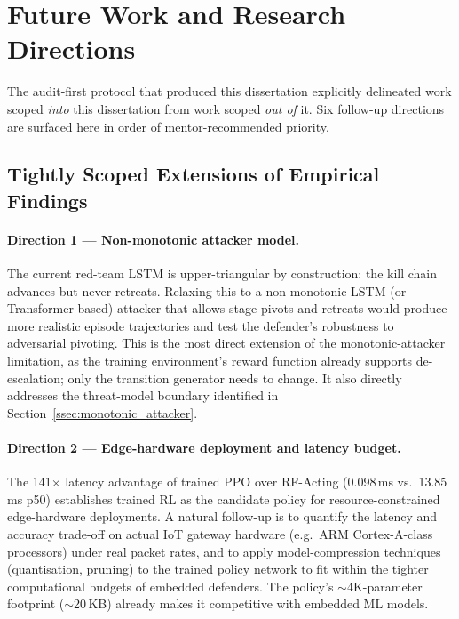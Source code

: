 \section{Future Work and Research Directions}\label{sec:future_work}
The audit-first protocol that produced this dissertation explicitly delineated work scoped \emph{into} this dissertation from work scoped \emph{out of} it. Six follow-up directions are surfaced here in order of mentor-recommended priority.

\subsection{Tightly Scoped Extensions of Empirical Findings}

\paragraph{Direction 1 --- Non-monotonic attacker model.} The current red-team LSTM is upper-triangular by construction: the kill chain advances but never retreats. Relaxing this to a non-monotonic LSTM (or Transformer-based) attacker that allows stage pivots and retreats would produce more realistic episode trajectories and test the defender's robustness to adversarial pivoting. This is the most direct extension of the monotonic-attacker limitation, as the training environment's reward function already supports de-escalation; only the transition generator needs to change. It also directly addresses the threat-model boundary identified in Section~\ref{ssec:monotonic_attacker}.

\paragraph{Direction 2 --- Edge-hardware deployment and latency budget.} The 141$\times$ latency advantage of trained PPO over RF-Acting (0.098\,ms vs.\ 13.85\,ms p50) establishes trained RL as the candidate policy for resource-constrained edge-hardware deployments. A natural follow-up is to quantify the latency and accuracy trade-off on actual IoT gateway hardware (e.g.\ ARM Cortex-A-class processors) under real packet rates, and to apply model-compression techniques (quantisation, pruning) to the trained policy network to fit within the tighter computational budgets of embedded defenders. The policy's $\sim$4K-parameter footprint ($\sim$20\,KB) already makes it competitive with embedded ML models.

